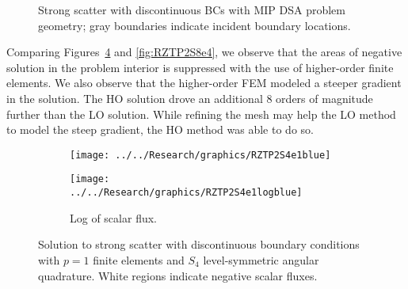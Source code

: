 \documentclass[12pt]{article}
\begin{document}
\begin{figure}[!htb]
\centering
{}
\caption{Strong scatter with discontinuous BCs with MIP DSA problem geometry; gray boundaries indicate incident boundary locations.}
\label{fig:StrongScatterProblem}
\end{figure}

Comparing Figures~\ref{fig:RZTP2S4e1} and \ref{fig:RZTP2S8e4}, we observe that the areas of negative solution in the problem interior is suppressed with the use of higher-order finite elements. We also observe that the higher-order FEM modeled a steeper gradient in the solution. The HO solution drove an additional 8 orders of magnitude further than the LO solution. While refining the mesh may help the LO method to model the steep gradient, the HO method was able to do so.

\begin{figure}[!htb]
\centering
\begin{subfigure}{0.45\textwidth}
\centering
\texttt{[image: ../../Research/graphics/RZTP2S4e1blue]}
\label{fig:RZTP2S8e4blue}
\end{subfigure}%
\hspace{0.05\textwidth}
\begin{subfigure}{0.45\textwidth}
\centering
\texttt{[image: ../../Research/graphics/RZTP2S4e1logblue]}
\caption{Log of scalar flux.}
\label{fig:RZTP2S8e4logblue}
\end{subfigure}
\caption{Solution to strong scatter with discontinuous boundary conditions with $p=1$ finite elements and $S_4$ level-symmetric angular quadrature. White regions indicate negative scalar fluxes.}
\label{fig:RZTP2S4e1}
\end{figure}
\end{document}
